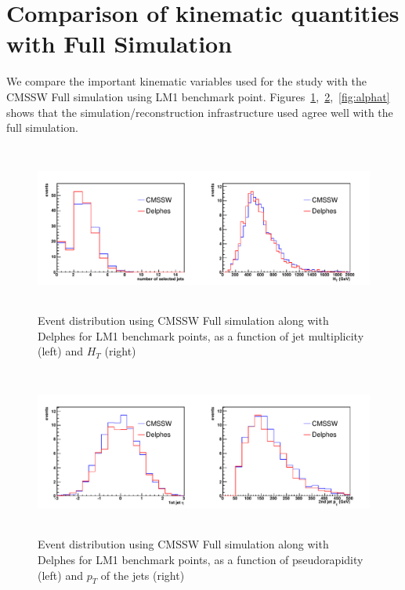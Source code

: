 \section{Comparison of kinematic quantities with Full Simulation}
\label{sec:cmsdelphescomp}
We compare the important kinematic variables used for the study with the CMSSW 
Full simulation using LM1 benchmark point. Figures~\ref{fig:njetht},~\ref{fig:jetpteta},~\ref{fig:alphat}
shows that the simulation/reconstruction infrastructure used agree well with the full simulation.

\begin{figure}[htbp]
\begin{center}
\includegraphics[height=5.5cm]{figs/njetht.pdf} 
\caption{Event distribution using CMSSW Full simulation along with Delphes for LM1 benchmark points, 
as a function of jet multiplicity (left) and $H_T$ (right)}
\label{fig:njetht}
\end{center}
\end{figure}


\begin{figure}[htbp]
\begin{center}
\includegraphics[height=5.5cm]{figs/jet1pteta.pdf} 
\caption{Event distribution using CMSSW Full simulation along with Delphes for LM1 benchmark points, 
as a function of pseudorapidity (left) and $p_T$ of the jets (right)}
\label{fig:jetpteta}
\end{center}
\end{figure}

